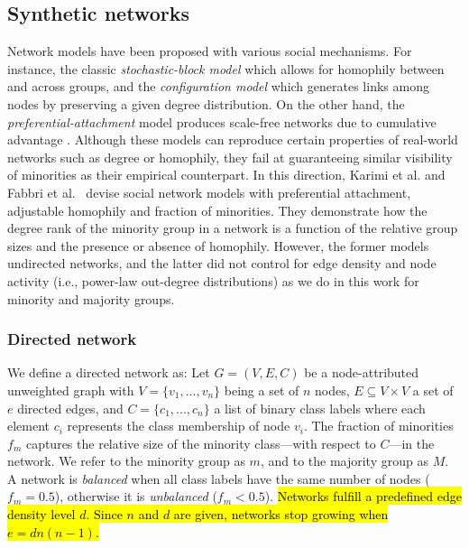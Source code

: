 \documentclass[fleqn,10pt]{wlscirep}
\begin{document}
\subsection*{Synthetic networks}
Network models have been proposed with various social mechanisms. For instance, the classic \textit{stochastic-block model} \cite{holland1983stochastic} which allows for homophily between and across groups, and the \textit{configuration model} \cite{newman2003structure} which generates links among nodes by preserving a given degree distribution. 
On the other hand, the \textit{preferential-attachment} model \cite{barabasi1999emergence} produces scale-free networks due to cumulative advantage \cite{merton1988matthew}. 
Although these models can reproduce certain properties of real-world networks such as degree or homophily, they fail at guaranteeing similar visibility of minorities as their empirical counterpart. 
In this direction, Karimi et al.\cite{karimi2018homophily} and Fabbri et al.~\cite{fabbri2020effect} devise social network models with preferential attachment, adjustable homophily and fraction of minorities. 
They demonstrate how the degree rank of the minority group in a network is a function of the relative group sizes and the presence or absence of homophily.
However, the former models undirected networks, and the latter did not control for edge density and node activity (i.e., power-law out-degree distributions) as we do in this work for minority and majority groups.


\subsubsection*{Directed network}
We define a directed network as: Let $G=(V,E,C)$ be a node-attributed unweighted graph with $V=\{v_1,...,v_n\}$ being a set of $n$ nodes, $E \subseteq  V \times V$ a set of $e$ directed edges, and $C=\{c_1,...,c_n\}$ a list of binary class labels where each element $c_i$ represents the class membership of node $v_i$. The fraction of minorities $f_m$ captures the relative size of the minority class---with respect to $C$---in the network. We refer to the minority group as $m$, and to the majority group as $M$. A network is \emph{balanced} when all class labels have the same number of nodes ($f_m=0.5$), otherwise it is \emph{unbalanced} ($f_m<0.5$). \hl{Networks fulfill a predefined edge density level $d$. Since $n$ and $d$ are given, networks stop growing when $e=d n (n-1)$.} 
\end{document}
